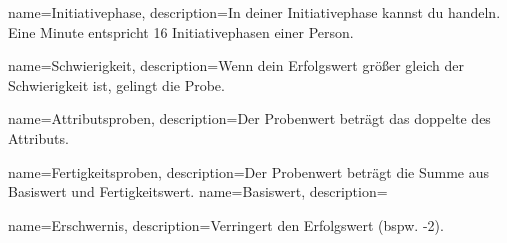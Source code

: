 {
    name=Initiativephase,
    description={In deiner Initiativephase kannst du handeln. Eine Minute entspricht 16 Initiativephasen einer Person.}
}

{
	name={Schwierigkeit},
	description={Wenn dein Erfolgswert größer gleich der Schwierigkeit ist, gelingt die Probe.}
}

{
    name={Attributsproben},
    description={Der Probenwert beträgt das doppelte des Attributs.}
}

{
    name={Fertigkeitsproben},
    description={Der Probenwert beträgt die Summe aus Basiswert und Fertigkeitswert.}
}
{
    name={Basiswert},
    description={}}

{
    name={Erschwernis},
    description={Verringert den Erfolgswert (bspw. -2).}}
    
